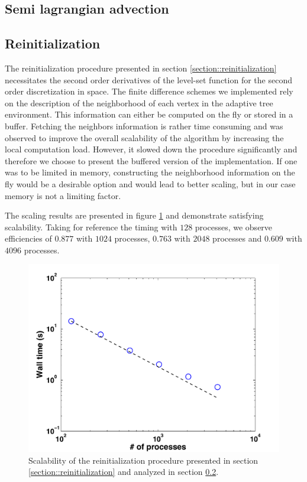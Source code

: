 \documentclass{elsarticle}
\begin{document}
\subsection{Semi lagrangian advection}

\subsection{Reinitialization} \label{section::scaling_reinitialization}

The reinitialization procedure presented in section \ref{section::reinitialization} necessitates the second order derivatives of the level-set function for the second order discretization in space. The finite difference schemes we implemented rely on the description of the neighborhood of each vertex in the adaptive tree environment. This information can either be computed on the fly or stored in a buffer. Fetching the neighbors information is rather time consuming and was observed to improve the overall scalability of the algorithm by increasing the local computation load. However, it slowed down the procedure significantly and therefore we choose to present the buffered version of the implementation. If one was to be limited in memory, constructing the neighborhood information on the fly would be a desirable option and would lead to better scaling, but in our case memory is not a limiting factor.

The scaling results are presented in figure \ref{fig::scaling_reinitialization} and demonstrate satisfying scalability. Taking for reference the timing with $128$ processes, we observe efficiencies of $0.877$ with $1024$ processes, $0.763$ with $2048$ processes and $0.609$ with $4096$ processes.

\begin{figure}[ht!]
\begin{center}
\includegraphics[width=.7\textwidth]{pictures/scaling_reinitialization_1st_time_2nd_space_with_buffer.pdf}
\caption{Scalability of the reinitialization procedure presented in section \ref{section::reinitialization} and analyzed in section \ref{section::scaling_reinitialization}.} \label{fig::scaling_reinitialization}
\end{center}
\end{figure}
\end{document}
